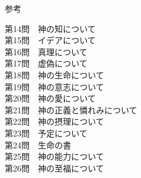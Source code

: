 \documentclass[paper=a4paper,fontsize=10pt,jafontsize=9pt,titlepage]{jlreq}
\begin{document}
\noindent
参考

\noindent
第14問　神の知について\\
第15問　イデアについて\\
第16問　真理について\\
第17問　虚偽について\\
第18問　神の生命について\\
第19問　神の意志について\\
第20問　神の愛について\\
第21問　神の正義と憐れみについて\\
第22問　神の摂理について\\
第23問　予定について\\
第24問　生命の書\\
第25問　神の能力について\\
第26問　神の至福について\\
\end{document}
